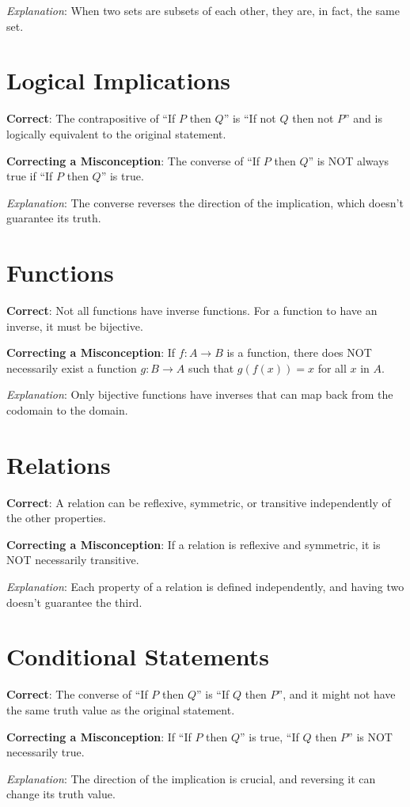 \documentclass[12pt]{article}
\begin{document}
\textit{Explanation}: When two sets are subsets of each other, they are, in fact, the same set.

\section*{Logical Implications}
\textbf{Correct}: The contrapositive of ``If \(P\) then \(Q\)'' is ``If not \(Q\) then not \(P\)'' and is logically equivalent to the original statement.

\textbf{Correcting a Misconception}: The converse of ``If \(P\) then \(Q\)'' is NOT always true if ``If \(P\) then \(Q\)'' is true.

\textit{Explanation}: The converse reverses the direction of the implication, which doesn't guarantee its truth.

\section*{Functions}
\textbf{Correct}: Not all functions have inverse functions. For a function to have an inverse, it must be bijective.

\textbf{Correcting a Misconception}: If \(f: A \rightarrow B\) is a function, there does NOT necessarily exist a function \(g: B \rightarrow A\) such that \(g(f(x)) = x\) for all \(x\) in \(A\).

\textit{Explanation}: Only bijective functions have inverses that can map back from the codomain to the domain.

\section*{Relations}
\textbf{Correct}: A relation can be reflexive, symmetric, or transitive independently of the other properties.

\textbf{Correcting a Misconception}: If a relation is reflexive and symmetric, it is NOT necessarily transitive.

\textit{Explanation}: Each property of a relation is defined independently, and having two doesn't guarantee the third.

\section*{Conditional Statements}
\textbf{Correct}: The converse of ``If \(P\) then \(Q\)'' is ``If \(Q\) then \(P\)'', and it might not have the same truth value as the original statement.

\textbf{Correcting a Misconception}: If ``If \(P\) then \(Q\)'' is true, ``If \(Q\) then \(P\)'' is NOT necessarily true.

\textit{Explanation}: The direction of the implication is crucial, and reversing it can change its truth value.
\end{document}
